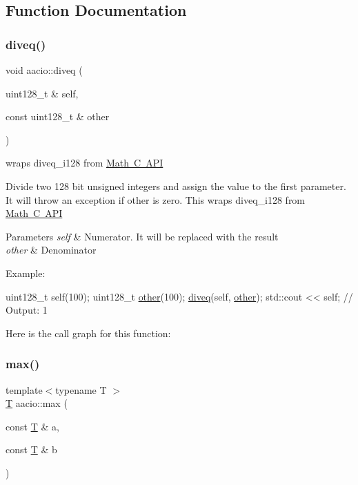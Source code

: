\subsection{Function Documentation}
\mbox{\label{group__mathcppapi_ga2a55d75a1be6cd50803e1e2905dea277}} 
\subsubsection{\texorpdfstring{diveq()}{diveq()}}
{\footnotesize\ttfamily void aacio\+::diveq (\begin{DoxyParamCaption}\item[{uint128\+\_\+t \&}]{self,  }\item[{const uint128\+\_\+t \&}]{other }\end{DoxyParamCaption})\hspace{0.3cm}{\ttfamily [inline]}}



wraps diveq\+\_\+i128 from \mbox{\hyperlink{group__mathcapi}{Math C A\+PI}} 

Divide two 128 bit unsigned integers and assign the value to the first parameter. It will throw an exception if other is zero. This wraps diveq\+\_\+i128 from \mbox{\hyperlink{group__mathcapi}{Math C A\+PI}} 
\begin{DoxyParams}{Parameters}
{\em self} & Numerator. It will be replaced with the result \\
\hline
{\em other} & Denominator\\
\hline
\end{DoxyParams}
Example\+: 
\begin{DoxyCode}
uint128\_t \textcolor{keyword}{self}(100);
uint128\_t \mbox{\hyperlink{structother}{other}}(100);
\mbox{\hyperlink{group__mathcppapi_ga2a55d75a1be6cd50803e1e2905dea277}{diveq}}(\textcolor{keyword}{self}, \mbox{\hyperlink{structother}{other}});
std::cout << \textcolor{keyword}{self}; \textcolor{comment}{// Output: 1}
\end{DoxyCode}
 Here is the call graph for this function\+:
\mbox{\label{group__mathcppapi_ga1cdad1dcbc2a3d9e6c440342c9bf5769}} 
\subsubsection{\texorpdfstring{max()}{max()}}
{\footnotesize\ttfamily template$<$typename T $>$ \\
\mbox{\hyperlink{struct_t}{T}} aacio\+::max (\begin{DoxyParamCaption}\item[{const \mbox{\hyperlink{struct_t}{T}} \&}]{a,  }\item[{const \mbox{\hyperlink{struct_t}{T}} \&}]{b }\end{DoxyParamCaption})}



